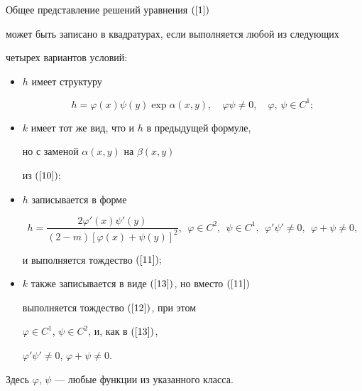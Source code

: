 \begin{thmnonum}


Общее представление решений уравнения $(\ref{1})$


может быть записано в квадратурах, если выполняется любой из следующих


четырех вариантов условий\/${:}$


\begin{itemize}


\item[a)] $h$ имеет структуру


$$


h=\varphi(x)\psi(y)\exp\alpha(x,y),\quad \varphi\psi\ne0,\quad


\varphi,\,\psi\in C^{1};


$$


\item[b)] $k$ имеет тот же вид, что и $h$  в предыдущей формуле,


но с заменой $\alpha(x,y)$ на $\beta(x,y)$


из $(\ref{10});$


\item[c)] $h$ записывается в форме


\begin{equation}\label{13}


h=\frac{2\varphi'(x)\psi'(y)}{(2-m)[\varphi(x)+\psi(y)]^{2}},


\ \  \varphi\in C^{2},\ \ \psi\in C^{1},\ \


\varphi'\psi'\ne0,\ \ \varphi+\psi\ne0,


\end{equation}


и выполняется тождество $(\ref{11});$


\item[d)] $k$ также записывается в виде $(\ref{13})$, но вместо $(\ref{11})$


выполняется тождество $(\ref{12})$, при этом


$\varphi\in C^{1}$, $\psi\in C^{2}$, и, как в $(\ref{13})$,


$\varphi'\psi'\ne0$, $\varphi+\psi\ne0$.


\end{itemize}





Здесь $\varphi$, $\psi$ --- любые функции из указанного класса.


\end{thmnonum}





